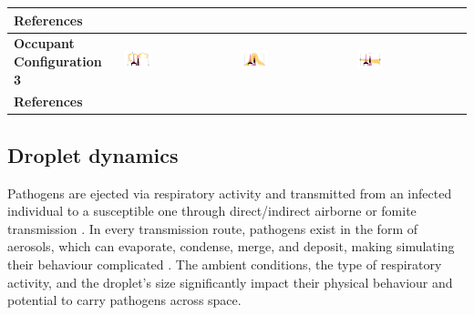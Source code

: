 \documentclass[a4paper,12pt]{elsarticle}
\begin{document}
\begin{table}[ht]
\begin{tabular}{|m{2.5cm}|m{4cm}|m{4cm}|m{4cm}|}
    \hline
    \textbf{References} & \cite{he2011cfd,yan2021transmission,mirzaie2021covid,li2021effects,shao2021risk,qin2023transmission,xu2023cfd} & \cite{he2011cfd,lu2022ventilation,jain2023numerical} & \cite{ho2021modeling,duill2021impact,ren2022practical,lu2022ventilation} \\
    \hline
    \textbf{Occupant Configuration 3} &\includegraphics[clip,trim={0 2cm 0 2cm},width=0.25\textwidth]{Airflow/mat3.jpeg}& \includegraphics[clip,trim={0 2cm 0 2cm},width=0.25\textwidth]{Airflow/mat6.jpeg}& \includegraphics[clip,trim={0 2cm 0 2cm},width=0.25\textwidth]{Airflow/mat9.jpeg} \\
    \hline
    \textbf{References} & \cite{hang2014influence,romano2015numerical,liu2020full,lu2020reducing,zhou2021experimental,guo2022visualization,liu2023estimating} & \cite{zhou2021experimental,villafruela2019assessment,lu2020reducing} & \cite{jiang2009investigating,lu2020reducing} \\
    \hline
    \end{tabular}

\end{table}

\subsection{Droplet dynamics}

Pathogens are ejected via respiratory activity and transmitted from an infected individual to a susceptible one through direct/indirect airborne or fomite transmission \cite{leung2021transmissibility}. In every transmission route, pathogens exist in the form of aerosols, which can evaporate, condense, merge, and deposit, making simulating their behaviour complicated \cite{rosti2020fluid,zhou2021dynamical}. The ambient conditions, the type of respiratory activity, and the droplet's size significantly impact their physical behaviour and potential to carry pathogens across space.
\end{document}
